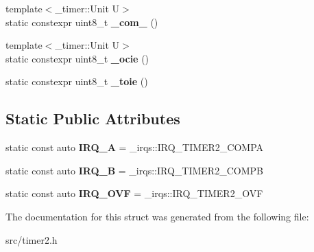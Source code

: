 \begin{DoxyCompactItemize}
{\footnotesize template$<$\+\_\+timer\+::\+Unit U$>$ }\\static constexpr uint8\+\_\+t {\bfseries \+\_\+com\+\_} ()
\item 
\hypertarget{struct__timer2_1_1TimerDef_ab77aee2b07c43d07a5c7e95c23d06013}{}\label{struct__timer2_1_1TimerDef_ab77aee2b07c43d07a5c7e95c23d06013} 
{\footnotesize template$<$\+\_\+timer\+::\+Unit U$>$ }\\static constexpr uint8\+\_\+t {\bfseries \+\_\+ocie} ()
\item 
\hypertarget{struct__timer2_1_1TimerDef_aa59a8f3a6a38e482611d438fc79307b4}{}\label{struct__timer2_1_1TimerDef_aa59a8f3a6a38e482611d438fc79307b4} 
static constexpr uint8\+\_\+t {\bfseries \+\_\+toie} ()
\end{DoxyCompactItemize}
\subsection*{Static Public Attributes}
\begin{DoxyCompactItemize}
\item 
\hypertarget{struct__timer2_1_1TimerDef_ad503a9efd5c167fcf37266cd6cf9240a}{}\label{struct__timer2_1_1TimerDef_ad503a9efd5c167fcf37266cd6cf9240a} 
static const auto {\bfseries I\+R\+Q\+\_\+A} = \+\_\+irqs\+::\+I\+R\+Q\+\_\+\+T\+I\+M\+E\+R2\+\_\+\+C\+O\+M\+PA
\item 
\hypertarget{struct__timer2_1_1TimerDef_ab0c4a6c52f3f57a3e2db98cf8740c704}{}\label{struct__timer2_1_1TimerDef_ab0c4a6c52f3f57a3e2db98cf8740c704} 
static const auto {\bfseries I\+R\+Q\+\_\+B} = \+\_\+irqs\+::\+I\+R\+Q\+\_\+\+T\+I\+M\+E\+R2\+\_\+\+C\+O\+M\+PB
\item 
\hypertarget{struct__timer2_1_1TimerDef_ae90a87cb6b1c430896596df0cd71a1e0}{}\label{struct__timer2_1_1TimerDef_ae90a87cb6b1c430896596df0cd71a1e0} 
static const auto {\bfseries I\+R\+Q\+\_\+\+O\+VF} = \+\_\+irqs\+::\+I\+R\+Q\+\_\+\+T\+I\+M\+E\+R2\+\_\+\+O\+VF
\end{DoxyCompactItemize}


The documentation for this struct was generated from the following file\+:\begin{DoxyCompactItemize}
\item 
src/timer2.\+h\end{DoxyCompactItemize}
